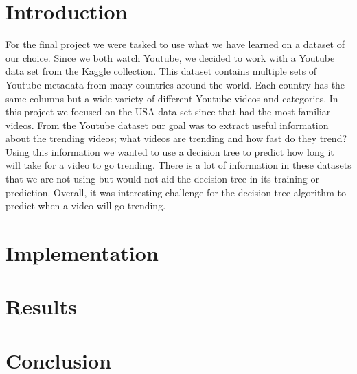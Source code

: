 \documentclass{article}
\begin{document}
\section*{Introduction}
For the final project we were tasked to use what we have learned on a dataset of our choice. 
Since we both watch Youtube, we decided to work with a Youtube data set from the Kaggle collection. 
This dataset contains multiple sets of Youtube metadata from many countries around the world. 
Each country has the same columns but a wide variety of different Youtube videos and categories. 
In this project we focused on the USA data set since that had the most familiar videos. 
From the Youtube dataset our goal was to extract useful information about the trending videos; what videos are trending and how fast do they trend?
Using this information we wanted to use a decision tree to predict how long it will take for a video to go trending. 
There is a lot of information in these datasets that we are not using but would not aid the decision tree in its training or prediction.
Overall, it was interesting challenge for the decision tree algorithm to predict when a video will go trending.
\section*{Implementation}
\section*{Results}
\section*{Conclusion}
\end{document}
